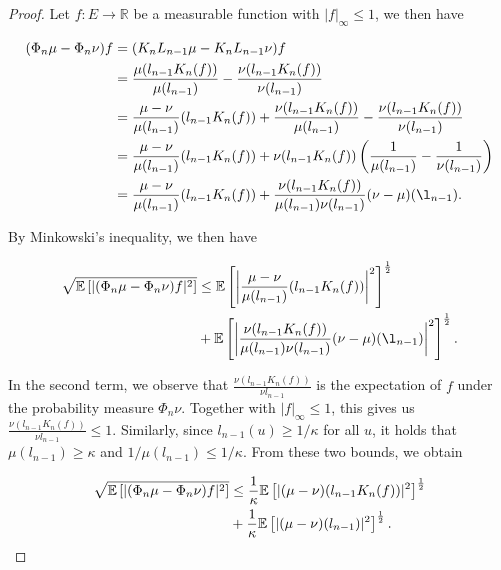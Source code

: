 \begin{proof}
  Let $f : E \rightarrow \mathbb{R}$ be a measurable function with $|f|_\infty \le 1$, we then have

  \begin{equation*}
    \begin{aligned}
      (\Phi_n\mu - \Phi_n\nu)f
      &= (K_nL_{n-1}\mu - K_nL_{n-1}\nu)f \\
      &= \frac{\mu(l_{n-1}K_n(f))}{\mu(l_{n-1})} - \frac{\nu(l_{n-1}K_n(f))}{\nu(l_{n-1})} \\
      &= \frac{\mu - \nu}{\mu(l_{n-1})}(l_{n-1}K_n(f)) + \frac{\nu(l_{n-1}K_n(f))}{\mu(l_{n-1})} - \frac{\nu(l_{n-1}K_n(f))}{\nu(l_{n-1})}\\
      &= \frac{\mu - \nu}{\mu(l_{n-1})}(l_{n-1}K_n(f)) + \nu(l_{n-1}K_n(f))\left(\frac1{\mu(l_{n-1})} - \frac1{\nu(l_{n-1})}\right)\\
      &= \frac{\mu - \nu}{\mu(l_{n-1})}(l_{n-1}K_n(f)) + \frac{ \nu(l_{n-1}K_n(f))}{\mu(l_{n-1})\nu(l_{n-1})}(\nu - \mu)(\l_{n-1}).
    \end{aligned}
  \end{equation*}
  
  By Minkowski's inequality, we then have

  \begin{equation*}
    \begin{aligned}
      \sqrt{\expec{|(\Phi_n\mu - \Phi_n\nu)f|^2}}
      &\leq \expec{\left|\frac{\mu - \nu}{\mu(l_{n-1})}(l_{n-1}K_n(f))\right|^2}^{\frac12}\\
      &+ \expec{\left|\frac{ \nu(l_{n-1}K_n(f))}{\mu(l_{n-1})\nu(l_{n-1})}(\nu - \mu)(\l_{n-1})\right|^2}^{\frac12}      .
    \end{aligned}
  \end{equation*}


  In the second term, we observe that $\frac{\nu(l_{n-1}K_n(f))}{\nu{l_{n-1}}}$ is the expectation of $f$ under the probability measure $\Phi_n \nu$. Together with $|f|_\infty \le 1$, this gives us $\frac{\nu(l_{n-1}K_n(f))}{\nu{l_{n-1}}} \le 1$. Similarly, since $l_{n-1}(u) \ge 1/\kappa$ for all $u$, it holds that $\mu(l_{n-1}) \ge \kappa$ and $1 / \mu(l_{n-1}) \le 1/\kappa$. From these two bounds, we obtain

  \begin{equation*}
    \begin{aligned}
      \sqrt{\mathbb{E}\left[|(\Phi_n\mu - \Phi_n\nu)f|^2\right]}
      &\le \frac1\kappa\mathbb{E}\left[|(\mu - \nu)(l_{n-1}K_n(f))|^2\right]^{\frac12}\\
      &+ \frac1\kappa\mathbb{E}\left[|(\mu - \nu)(l_{n-1})|^2\right]^{\frac12}.
    \end{aligned}
  \end{equation*}



\end{proof}
